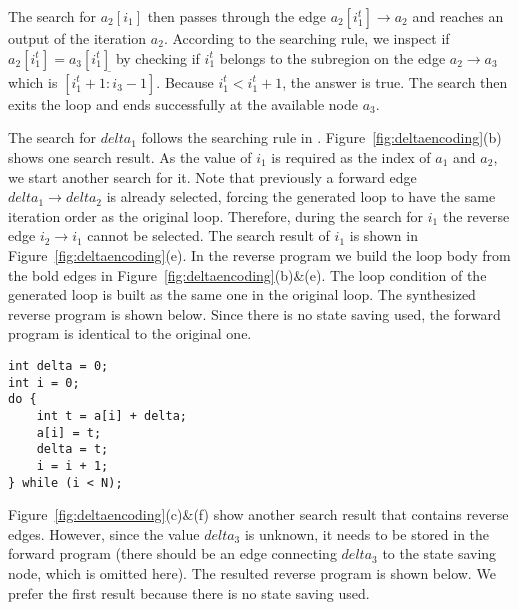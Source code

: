 The search for $a_2[i_1]$ then passes through the edge $a_2[i_1^t]\to a_2$ and reaches an output of the iteration $a_2$. 
According to the searching rule, we inspect if $a_2[i_1^t]=a_3[i_1^t]$ by checking if $i_1^t$ belongs to the subregion on the edge $a_2\to a_3$ which is $\overline{[i_1^t+1:i_3-1]}$. 
Because $i_1^t<i_1^t+1$, the answer is true.
The search then exits the loop  and ends successfully at the available node $a_3$.

The search for $delta_1$ follows the searching rule in \cite{HouRC}.
%
Figure~\ref{fig:deltaencoding}(b) shows one search result. 
As the value of $i_1$ is required as the index of $a_1$ and $a_2$, we start another search for it.
Note that previously a forward edge $delta_1 \to delta_2$ is already selected, forcing the generated loop to have the same iteration order as the original loop. 
Therefore, during the search for $i_1$ the reverse edge $i_2\to i_1$ cannot be selected.
The search result of $i_1$ is shown in Figure~\ref{fig:deltaencoding}(e).
In the reverse program we build the loop body from the bold edges in  Figure~\ref{fig:deltaencoding}(b)\&(e).
The loop condition of the generated loop is built as the same  one  in the original loop.
The synthesized reverse program is shown below.
Since there is no state saving used, the forward program is identical to the original one.


\begin{lstlisting}
int delta = 0;
int i = 0;
do {
    int t = a[i] + delta;
    a[i] = t;
    delta = t;
    i = i + 1;
} while (i < N);
\end{lstlisting}

Figure~\ref{fig:deltaencoding}(c)\&(f) show another search result that contains reverse edges.
However, since the value $delta_3$ is unknown, it needs to be stored in the forward program (there should be an edge connecting $delta_3$ to the state saving node, which is omitted here).
The resulted reverse program is shown below.
We prefer the first result because there is no state saving used.
%
%

